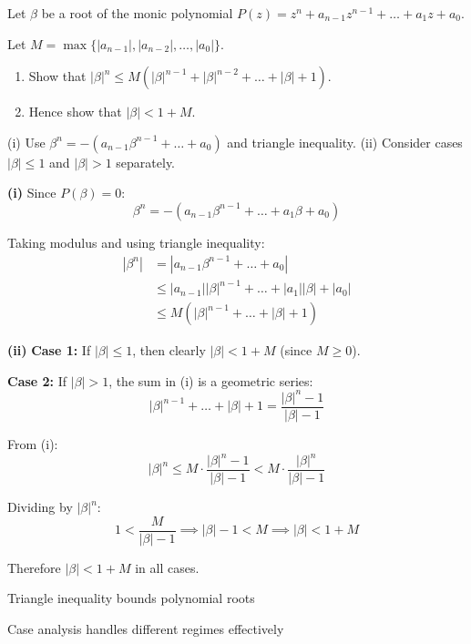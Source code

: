 \begin{problem}
Let $\beta$ be a root of the monic polynomial $P(z) = z^n + a_{n-1}z^{n-1} + \dots + a_1z + a_0$.

Let $M = \max\{|a_{n-1}|, |a_{n-2}|, \dots, |a_0|\}$.

\begin{enumerate}
    \item[(i)] Show that $|\beta|^n \le M(|\beta|^{n-1} + |\beta|^{n-2} + \dots + |\beta| + 1)$.
    \item[(ii)] Hence show that $|\beta| < 1 + M$.
\end{enumerate}
\end{problem}

\begin{hint}
(i) Use $\beta^n = -(a_{n-1}\beta^{n-1} + \dots + a_0)$ and triangle inequality. (ii) Consider cases $|\beta| \le 1$ and $|\beta| > 1$ separately.
\end{hint}

\begin{solution}
\textbf{(i)} Since $P(\beta) = 0$:
\[ \beta^n = -(a_{n-1}\beta^{n-1} + \dots + a_1\beta + a_0) \]

Taking modulus and using triangle inequality:
\begin{align*}
|\beta^n| &= |a_{n-1}\beta^{n-1} + \dots + a_0| \\
&\le |a_{n-1}||\beta|^{n-1} + \dots + |a_1||\beta| + |a_0| \\
&\le M(|\beta|^{n-1} + \dots + |\beta| + 1)
\end{align*}

\textbf{(ii)} \textbf{Case 1:} If $|\beta| \le 1$, then clearly $|\beta| < 1 + M$ (since $M \ge 0$).

\textbf{Case 2:} If $|\beta| > 1$, the sum in (i) is a geometric series:
\[ |\beta|^{n-1} + \dots + |\beta| + 1 = \frac{|\beta|^n - 1}{|\beta| - 1} \]

From (i):
\[ |\beta|^n \le M \cdot \frac{|\beta|^n - 1}{|\beta| - 1} < M \cdot \frac{|\beta|^n}{|\beta| - 1} \]

Dividing by $|\beta|^n$:
\[ 1 < \frac{M}{|\beta| - 1} \implies |\beta| - 1 < M \implies |\beta| < 1 + M \]

Therefore $|\beta| < 1 + M$ in all cases.
\end{solution}

\begin{takeaways}

\item Triangle inequality bounds polynomial roots
\item Case analysis handles different regimes effectively

\end{takeaways}

